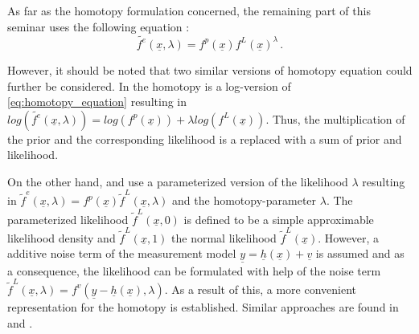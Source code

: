 \documentclass[a4paper]{IEEEtran}
\begin{document}
 As far as the homotopy formulation concerned, the remaining part of this seminar uses the following equation \cite{hagmar2011}:
 \begin{equation}
    \tilde{f^e}(\underline{x},\lambda) = f^p(\underline{x})f^L(\underline{x})^{\lambda} \,.
    \label{eq:homotopy_equation}
 \end{equation}

However, it should be noted that two similar versions of homotopy equation could further be considered. In \cite{daum2007} the homotopy is a log-version of \eqref{eq:homotopy_equation}
resulting in $log(\tilde{f^e}(\underline{x},\lambda)) = log(f^p(\underline{x})) + \lambda log(f^L(\underline{x}))$. Thus, the multiplication of the prior and the corresponding likelihood is a replaced with a sum of prior and likelihood.

On the other hand, \cite{hanebeck2003b} and \cite{hanebeck2003} use a parameterized version of the likelihood $\lambda$ resulting in $\tilde{f}^{e}(\underline{x}, \lambda)=f^{p}(\underline{x})\tilde{f}^{L}(\underline{x}, \lambda)$ and the homotopy-parameter $\lambda$. 
The parameterized likelihood $\tilde{f}^{L}(\underline{x}, 0)$ is defined to be a simple approximable likelihood density and $\tilde{f}^{L}(\underline{x}, 1)$ the normal likelihood $\tilde{f}^{L}(\underline{x})$. However, a additive noise term of the measurement model $\underline{y}=\underline{h}(\underline{x}) + \underline{v}$ is assumed and as a consequence,
the likelihood can be formulated with help of the noise term $\tilde{f}^{L}(\underline{x}, \lambda) = f^{v}(\underline{y}-\underline{h}(\underline{x}), \lambda)$. As a result of this, a more convenient representation for the homotopy is established. Similar approaches are found in \cite{hanebeck2012a} and \cite{hanebeck}.
\end{document}
